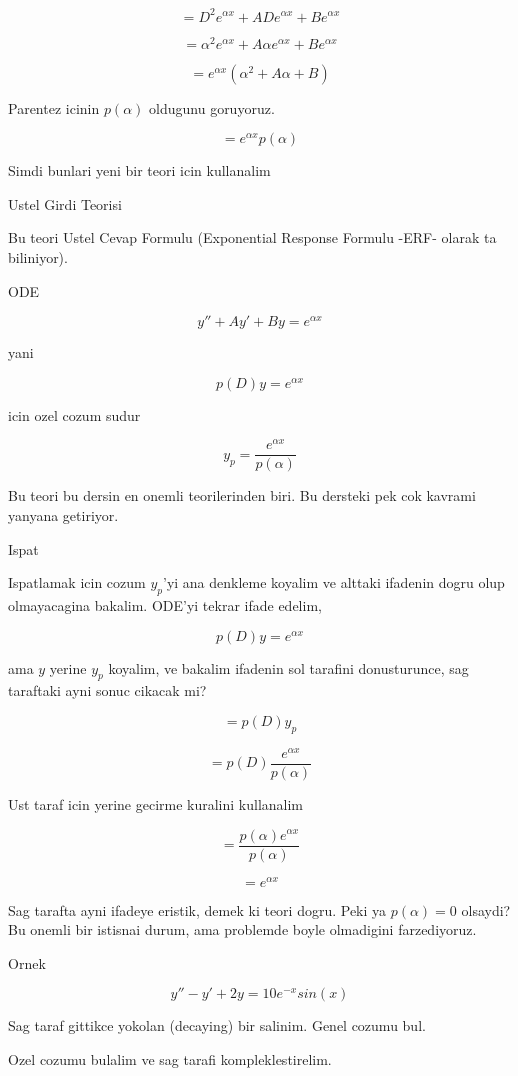 \documentclass[12pt,fleqn]{article}
\begin{document}
\[ = D^2e^{\alpha x} + ADe^{\alpha x} + Be^{\alpha x} \]

\[ = \alpha^2 e^{\alpha x} + A \alpha e^{\alpha x} + Be^{\alpha x} \]

\[ = e^{\alpha x}(\alpha^2  + A \alpha + B)\]

Parentez icinin $p(\alpha)$ oldugunu goruyoruz. 

\[ = e^{\alpha x}p(\alpha)\]

Simdi bunlari yeni bir teori icin kullanalim

Ustel Girdi Teorisi 

Bu teori Ustel Cevap Formulu (Exponential Response Formulu -ERF- olarak ta
biliniyor).

ODE

\[ y'' + Ay' + By = e^{\alpha x} \]

yani

\[ p(D)y = e^{\alpha x} \]

icin ozel cozum sudur

\[ y_p = \frac{e^{\alpha x}}{p(\alpha)} \]

Bu teori bu dersin en onemli teorilerinden biri. Bu dersteki pek cok
kavrami yanyana getiriyor. 

Ispat

Ispatlamak icin cozum $y_p$'yi ana denkleme koyalim ve alttaki ifadenin dogru
olup olmayacagina bakalim. ODE'yi tekrar ifade edelim, 

\[ p(D)y =  e^{\alpha x} \]

ama $y$ yerine $y_p$ koyalim, ve bakalim ifadenin sol tarafini
donusturunce, sag taraftaki ayni sonuc cikacak mi?

\[ = p(D)y_p\]

\[ = p(D)\frac{e^{\alpha x}}{p(\alpha)}  \]

Ust taraf icin yerine gecirme kuralini kullanalim

\[ = \frac{p(\alpha)e^{\alpha x}}{p(\alpha)} \]

\[ = e^{\alpha x} \]

Sag tarafta ayni ifadeye eristik, demek ki teori dogru. Peki ya $p(\alpha)
= 0$ olsaydi? 
Bu onemli bir istisnai durum, ama problemde boyle olmadigini farzediyoruz.

Ornek 

\[ y'' - y' + 2y = 10e^{-x}sin(x) \]

Sag taraf gittikce yokolan (decaying) bir salinim. Genel cozumu bul.

Ozel cozumu bulalim ve sag tarafi kompleklestirelim. 
\end{document}

